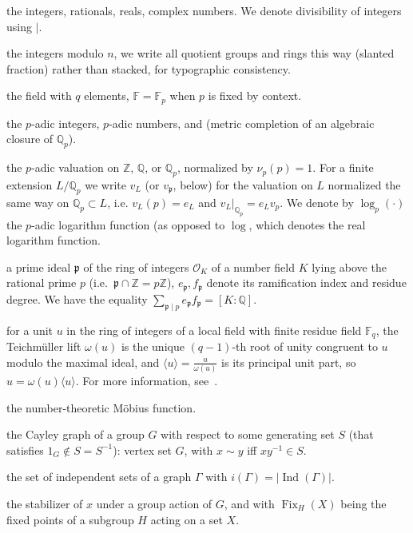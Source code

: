 \documentclass{article}
\theoremstyle{plain}
\theoremstyle{definition}
\theoremstyle{remark}
\newcommand{\Z}{\mathbb{Z}}
\newcommand{\Q}{\mathbb{Q}}
\newcommand{\R}{\mathbb{R}}
\newcommand{\C}{\mathbb{C}}
\newcommand{\F}{\mathbb{F}}
\newcommand{\Zp}{\mathbb{Z}_p}
\newcommand{\Qp}{\mathbb{Q}_p}
\newcommand{\Cp}{\mathbb{C}_p}
\newcommand{\quot}[2]{\sfrac{#1}{#2}}
\DeclareMathOperator{\Fix}{Fix}
\DeclareMathOperator{\Cay}{Cay}
\DeclareMathOperator{\Stab}{Stab}
\DeclareMathOperator{\Ind}{Ind}
\begin{document}
\begin{description}[leftmargin=2.2cm,style=nextline]
\item[$\Z,\Q,\R,\C$] the integers, rationals, reals, complex numbers. We denote divisibility of integers using $\mid$. 
\item[$\quot{\Z}{n\Z}$] the integers modulo $n$, we write all quotient groups and rings this way (slanted fraction) rather than stacked, for typographic consistency.
\item[$\F_q$] the field with $q$ elements, $\F=\F_p$ when $p$ is fixed by context.
\item[$\Zp,\Qp,\Cp$] the $p$-adic integers, $p$-adic numbers, and (metric completion of an algebraic closure of $\Qp$).
\item[$\nu_p$] the $p$-adic valuation on $\Z$, $\Q$, or $\Qp$, normalized by $\nu_p(p)=1$. For a finite extension $L/\Qp$ we write $v_L$ (or $v_\mathfrak p$, below) for the valuation on $L$ normalized the same way on $\Qp\subset L$, i.e.  $v_L(p)=e_L$ and $v_L|_{\Qp} = e_Lv_p$. We denote by $\log_p(\cdot)$ the $p$-adic logarithm function (as opposed to $\log$, which denotes the real logarithm function. 
\item[$\mathfrak p\mid p$] a prime ideal $\mathfrak p$ of the ring of integers $\mathcal O_K$ of a number field $K$ lying above the rational prime $p$ (i.e.\ $\mathfrak p\cap\Z=p\Z$), $e_\mathfrak p,f_\mathfrak p$ denote its ramification index and residue degree. We have the equality $\sum_{\mathfrak p\mid p}e_\mathfrak p f_\mathfrak p=[K:\Q]$.
\item[$\omega(u),\ \langle u\rangle$] for a unit $u$ in the ring of integers of a local field with finite residue field $\F_q$, the Teichm\"uller lift $\omega(u)$ is the unique $(q-1)$-th root of unity congruent to $u$ modulo the maximal ideal, and $\langle u\rangle=\frac{u}{\omega(u)}$ is its principal unit part, so $u=\omega(u)\langle u\rangle$. For more information, see~\cite[Ch.~II]{Serre}.
\item[$\mu$] the number-theoretic M\"obius function.
\item[$\Cay(G,S)$] the Cayley graph of a group $G$ with respect to some generating set $S$ (that satisfies $1_G \notin S=S^{-1}$): vertex set $G$, with $x\sim y$ iff $xy^{-1}\in S$.
\item[$\Ind(\Gamma)$] the set of independent sets of a graph $\Gamma$ with $i(\Gamma)=|\Ind(\Gamma)|$.
\item[$\Stab_G(x)$] the stabilizer of $x$ under a group action of $G$, and with $\Fix_H(X)$ being the fixed points of a subgroup $H$ acting on a set $X$.

\end{description}
\end{document}
